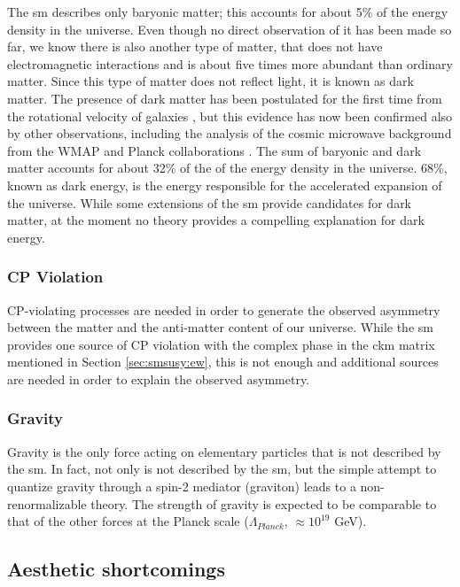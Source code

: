 The \gls{sm} describes only baryonic matter; this accounts for about 5\% of the energy density in the universe. Even though no direct observation of it has been made so far, we know there is also another type of matter, that does not have electromagnetic interactions and  is about five times more abundant than ordinary matter.  Since this type of matter does not reflect light, it is known as dark matter. The presence of dark matter has been postulated for the first time from the rotational velocity of galaxies \cite{Zwicky:1937zza}, but this evidence has now been confirmed also by other observations, including the analysis of the cosmic microwave background from the WMAP and Planck collaborations \cite{Larson:2010gs,Ade:2013zuv}. The sum of baryonic and dark matter accounts for about 32\% of the of the energy density in the universe. 68\%, known as dark energy, is the energy responsible for the accelerated expansion of the universe. While some extensions of the \gls{sm} provide candidates for dark matter, at the moment no theory provides a compelling explanation for dark energy.


\subsubsection*{CP Violation}

CP-violating processes are needed in order to generate the observed asymmetry between the matter and the anti-matter content of our universe. While the \gls{sm} provides one source of CP violation with the complex phase in the \gls{ckm} matrix mentioned in Section \ref{sec:smsusy:ew}, this is not enough and additional sources are needed in order to explain the observed asymmetry.

\subsubsection*{Gravity}

Gravity is the only force acting on elementary particles that is not described by the \gls{sm}. In fact, not only is not described by the \gls{sm}, but the simple attempt to quantize gravity through a spin-2  mediator (graviton) leads to a non-renormalizable theory. The strength of gravity is expected to be comparable to that of the other forces at the Planck scale ($\Lambda_{Planck}$, $\approx 10^{19}$ GeV). 

\subsection{Aesthetic shortcomings}
\label{sec:sm:aesthetics}

